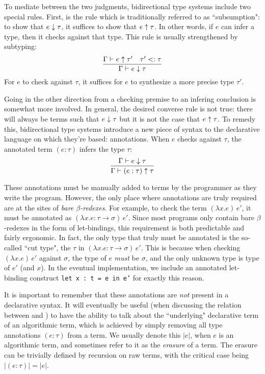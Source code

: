 
To mediate between the two judgments, bidirectional type systems include two special rules. First, is the rule which is traditionally referred to as ``subsumption": to show that $e \downarrow \tau$, it suffices to show that $e \uparrow \tau$. In other words, if $e$ can infer a type, then it checks against that type. This rule is usually strengthened by subtyping:
$$
\infer{\Gamma \vdash e \checks \tau}{\Gamma \vdash e \infers \tau' & \tau' \subty \tau}
$$ For $e$ to check against $\tau$, it suffices for $e$ to synthesize a more precise type $\tau'$.

Going in the other direction from a checking premise to an infering conclusion is somewhat more involved. In general, the desired converse rule is not true: there will always be terms such that $e \downarrow \tau$ but it is not the case that $e \uparrow \tau$. To remedy this, bidirectional type systems introduce a new piece of syntax to the declarative language on which they're based: annotations. When $e$ checks against $\tau$, the annotated term $(e : \tau)$ infers the type $\tau$:
$$
\infer{\Gamma \vdash (e : \tau) \infers \tau}{\Gamma \vdash e \checks \tau}
$$

These annotations must be manually added to terms by the programmer as they write the program. However, the only place where annotations are truly required are at the sites of \textit{bare $\beta$-redexes}. For example, to check the term $(\lambda x. e)\, e'$, it must be annotated as $(\lambda x.e : \tau \to \sigma) \, e'$. Since most programs only contain bare $\beta$-redexes in the form of let-bindings, this requirement is both predictable and fairly ergonomic. In fact, the only type that truly must be annotated is the so-called ``cut type", the $\tau$ in $(\lambda x.e : \tau \to \sigma) \, e'$. This is because when checking $(\lambda x. e)\, e'$ against $\sigma$, the type of $e$ \textit{must} be $\sigma$, and the only unknown type is type of $e'$ (and $x$). In the eventual implementation, we include an annotated let-binding construct \texttt{let x : t = e in e'} for exactly this reason.

It is important to remember that these annotations are \textit{not} present in a declarative syntax. It will eventually be useful (when discussing the relation between \bilambdaamor and \dlambdaamor) to have the ability to talk about the ``underlying" declarative term of an algorithmic term, which is achieved by simply removing all type annotations $(e : \tau)$ from a term. We usually denote this $|e|$, when $e$ is an algorithmic term, and sometimes refer to it as the \textit{erasure} of a term. The erasure can be trivially defined by recursion on raw terms, with the critical case being $|(e : \tau)| = |e|$.

